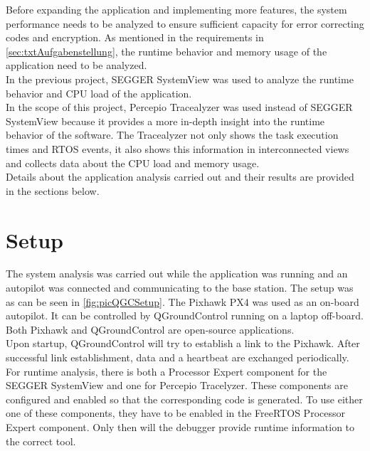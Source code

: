 %
Before expanding the application and implementing more features, the system performance needs to be analyzed to ensure sufficient capacity for error correcting codes and encryption. As mentioned in the requirements in \autoref{sec:txtAufgabenstellung}, the runtime behavior and memory usage of the application need to be analyzed.\\
In the previous project, SEGGER SystemView was used to analyze the runtime behavior and CPU load of the application.\\
In the scope of this project, Percepio Tracealyzer was used instead of SEGGER SystemView because it provides a more in-depth insight into the runtime behavior of the software. The Tracealyzer not only shows the task execution times and RTOS events, it also shows this information in interconnected views and collects data about the CPU load and memory usage.\\
Details about the application analysis carried out and their results are provided in the sections below.
%
%
\section{Setup}
%
The system analysis was carried out while the application was running and an autopilot was connected and communicating to the base station. The setup was as can be seen in \autoref{fig:picQGCSetup}. The Pixhawk PX4 was used as an on-board autopilot. It can be controlled by QGroundControl running on a laptop off-board. Both Pixhawk and QGroundControl are open-source applications.\\
Upon startup, QGroundControl will try to establish a link to the Pixhawk. After successful link establishment, data and a heartbeat are exchanged periodically.\\
For runtime analysis, there is both a Processor Expert component for the SEGGER SystemView and one for Percepio Tracelyzer. These components are configured and enabled so that the corresponding code is generated. To use either one of these components, they have to be enabled in the FreeRTOS Processor Expert component. Only then will the debugger provide runtime information to the correct tool.\\
%
%
